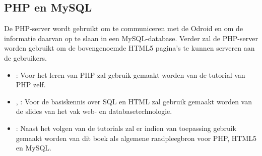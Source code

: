 \subsection{PHP en MySQL}

De PHP-server wordt gebruikt om te communiceren met de Odroid en om de informatie daarvan op te slaan in een MySQL-database. Verder zal de PHP-server worden gebruikt om de bovengenoemde HTML5 pagina's te kunnen serveren aan de gebruikers.


\begin{itemize}
\item
\cite{php_manual}: Voor het leren van PHP zal gebruik gemaakt worden van de tutorial van PHP zelf.

\item
\cite{slidesTI1506}, \cite{database_book}: Voor de basiskennis over SQL en HTML zal gebruik gemaakt worden van de slides van het vak web- en databasetechnologie.

\item
\cite{reference_php_html5_mysql}: Naast het volgen van de tutorials zal er indien van toepassing gebruik gemaakt worden van dit boek als algemene raadpleegbron voor PHP, HTML5 en MySQL.

\end{itemize}
